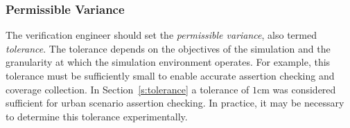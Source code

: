 \documentclass[letterpaper, 10 pt, journal, twoside]{IEEEtran}
\begin{document}
\subsubsection{Permissible Variance} \label{s:threshold}
The verification engineer should set the \textit{permissible variance}, also termed \textit{tolerance}.
%
The tolerance depends on the objectives of the simulation and the granularity at which the simulation environment operates. For example, this tolerance must be sufficiently small to enable accurate assertion checking and coverage collection. In Section~\ref{s:tolerance} a tolerance of $1$cm was considered sufficient for urban scenario assertion checking. In practice, it may be necessary to determine this tolerance experimentally. 

%





\end{document}
